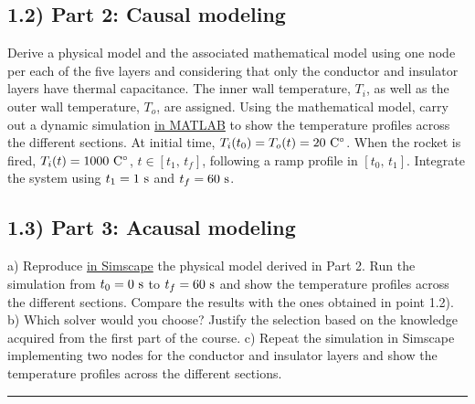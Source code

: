 \documentclass[11pt,a4paper,oneside]{article}
\begin{document}
\subsection*{1.2) Part 2: Causal modeling}
Derive a physical model and the associated mathematical model using one node per each of the five layers and considering that only the conductor and insulator layers have thermal capacitance.
The inner wall temperature, $T_i$, as well as the outer wall temperature, $T_o$, are assigned.
Using the mathematical model, carry out a dynamic simulation \underline{in MATLAB} to show the temperature profiles across the different sections.
At initial time, $T_i(t_0)=T_o(t) = 20\ {\rm C^\circ}$. When the rocket is fired, $T_i(t) = 1000\ {\rm C^\circ}$, $t\in[t_1,\,t_f]$, following a ramp profile in $[t_0,\,t_1]$.
Integrate the system using $t_1 = 1\ {\rm s}$ and $t_f = 60\ {\rm s}$.

\subsection*{1.3) Part 3: Acausal modeling}
a) Reproduce \underline{in Simscape} the physical model derived in Part 2. Run the simulation from $t_0 = 0\ {\rm s}$ to $t_f = 60\ {\rm s}$ and show the temperature profiles across the different sections. Compare the results with the ones obtained in point 1.2). 
b) Which solver would you choose? Justify the selection based on the knowledge acquired from the first part of the course.
c) Repeat the simulation in Simscape implementing two nodes for the conductor and insulator layers and show the temperature profiles across the different sections.
\medskip

\medskip \hrule \medskip
{}
\medskip
\end{document}

